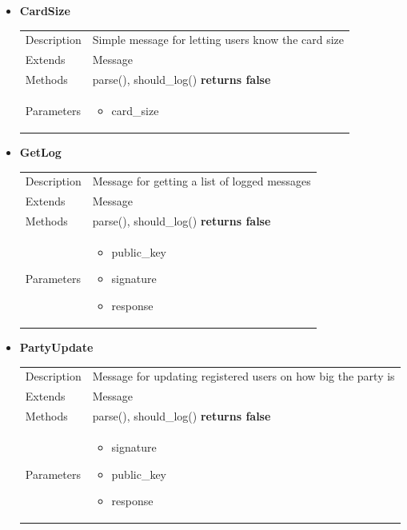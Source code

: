 \documentclass[11pt]{article}
\begin{document}
\begin{itemize}
\item
  \textbf{CardSize}

  
  \begin{longtable}[]{@{}ll@{}}
  \toprule
  \endhead
  Description & Simple message for letting users know the card size \tabularnewline
  Extends & Message\tabularnewline
  Methods & parse(), should\_log() \textbf{returns false}\tabularnewline
  \begin{minipage}[t]{0.40\columnwidth}\raggedright
  Parameters\strut
  \end{minipage} & \begin{minipage}[t]{0.54\columnwidth}\raggedright
  \begin{itemize}
  	\item card\_size
  \end{itemize}\strut
  \end{minipage}\tabularnewline
  \bottomrule
  \end{longtable}
\item
  \textbf{GetLog}


  \begin{longtable}[]{@{}ll@{}}
  \toprule
  \endhead
  Description & Message for getting a list of logged messages \tabularnewline
  Extends & Message\tabularnewline
  Methods & parse(), should\_log() \textbf{returns false}\tabularnewline
  \begin{minipage}[t]{0.40\columnwidth}\raggedright
  Parameters\strut
  \end{minipage} & \begin{minipage}[t]{0.54\columnwidth}\raggedright
  \begin{itemize}
  	\item public\_key
  	\item signature
  	\item response
  \end{itemize}\strut
  \end{minipage}\tabularnewline
  \bottomrule
  \end{longtable}

\item
  \textbf{PartyUpdate}

  \begin{longtable}[]{@{}ll@{}}
  \toprule
  \endhead
  Description & Message for updating registered users on how big the party is \tabularnewline
  Extends & Message\tabularnewline
  Methods & parse(), should\_log() \textbf{returns false}\tabularnewline
  \begin{minipage}[t]{0.40\columnwidth}\raggedright
  Parameters\strut
  \end{minipage} & \begin{minipage}[t]{0.54\columnwidth}\raggedright
  \begin{itemize}
  	\item signature
  	\item public\_key
  	\item response
  \end{itemize}\strut
  \end{minipage}\tabularnewline
  \bottomrule
  \end{longtable}


\end{itemize}
\end{document}
